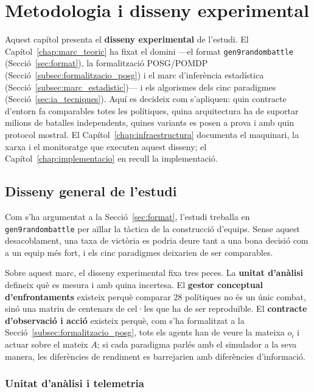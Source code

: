 \chapter{Metodologia i disseny experimental}
\label{chap:metodologia}

Aquest capítol presenta el \textbf{disseny experimental} de l'estudi. El Capítol~\ref{chap:marc_teoric} ha fixat el domini ---el format \texttt{gen9randombattle} (Secció~\ref{sec:format}), la formalització POSG/POMDP (Secció~\ref{subsec:formalitzacio_posg}) i el marc d'inferència estadística (Secció~\ref{subsec:marc_estadistic})--- i els algorismes dels cinc paradigmes (Secció~\ref{sec:ia_tecniques}). Aquí es decideix com s'apliquen: quin contracte d'entorn fa comparables totes les polítiques, quina arquitectura ha de suportar milions de batalles independents, quines variants es posen a prova i amb quin protocol mostral. El Capítol~\ref{chap:infraestructura} documenta el maquinari, la xarxa i el monitoratge que executen aquest disseny; el Capítol~\ref{chap:implementacio} en recull la implementació.

\section{Disseny general de l'estudi}
\label{sec:disseny_general}

Com s'ha argumentat a la Secció~\ref{sec:format}, l'estudi treballa en \texttt{gen9randombattle} per aïllar la tàctica de la construcció d'equips. Sense aquest desacoblament, una taxa de victòria es podria deure tant a una bona decisió com a un equip més fort, i els cinc paradigmes deixarien de ser comparables.

Sobre aquest marc, el disseny experimental fixa tres peces. La \textbf{unitat d'anàlisi} defineix què es mesura i amb quina incertesa. El \textbf{gestor conceptual d'enfrontaments} existeix perquè comparar 28 polítiques no és un únic combat, sinó una matriu de centenars de cel·les que ha de ser reproduïble. El \textbf{contracte d'observació i acció} existeix perquè, com s'ha formalitzat a la Secció~\ref{subsec:formalitzacio_posg}, tots els agents han de veure la mateixa $o_i$ i actuar sobre el mateix $A$; si cada paradigma parlés amb el simulador a la seva manera, les diferències de rendiment es barrejarien amb diferències d'informació.

\subsection{Unitat d'anàlisi i telemetria}


